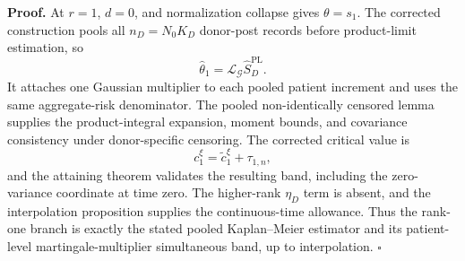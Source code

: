 \textbf{Proof.}
At \(r=1\), \(d=0\), and normalization collapse gives \(\theta=s_1\). The corrected construction pools all \(n_D=N_0K_D\) donor-post records before product-limit estimation, so
\[
 \widehat\theta_1=\mathcal L_{\mathcal G}\widehat S_D^{\mathrm{PL}}. \tag{1}
\]
It attaches one Gaussian multiplier to each pooled patient increment and uses the same aggregate-risk denominator. The pooled non-identically censored lemma supplies the product-integral expansion, moment bounds, and covariance consistency under donor-specific censoring. The corrected critical value is
\[
 c_1^\xi=\widetilde c_1^\xi+\tau_{1,n},                  \tag{2}
\]
and the attaining theorem validates the resulting band, including the zero-variance coordinate at time zero. The higher-rank \(\eta_D\) term is absent, and the interpolation proposition supplies the continuous-time allowance. Thus the rank-one branch is exactly the stated pooled Kaplan--Meier estimator and its patient-level martingale-multiplier simultaneous band, up to interpolation. \(\square\)
